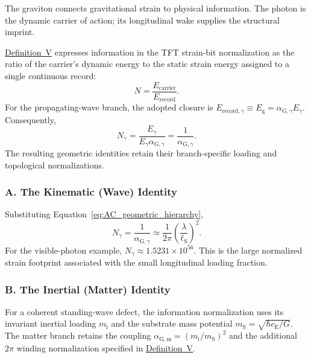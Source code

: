 The graviton connects gravitational strain to physical information. The photon is the dynamic carrier of action; its longitudinal wake supplies the structural imprint.

\hyperref[def:definition_five]{Definition~V} expresses information in the TFT strain-bit normalization as the ratio of the carrier's dynamic energy to the static strain energy assigned to a single continuous record:
\begin{equation}
    N=\frac{E_{\mathrm{carrier}}}{E_{\mathrm{record}}}.
    \label{eq:AC_information_ratio}
\end{equation}
For the propagating-wave branch, the adopted closure is $E_{\mathrm{record},\gamma}\equiv E_{\mathrm g}=\alpha_{\mathrm G,\gamma}E_\gamma$. Consequently,
\begin{equation}
    N_\gamma
    =\frac{E_\gamma}{E_\gamma\alpha_{\mathrm G,\gamma}}
    =\frac{1}{\alpha_{\mathrm G,\gamma}}.
    \label{eq:AC_photon_information_ratio}
\end{equation}
The resulting geometric identities retain their branch-specific loading and topological normalizations.

\subsubsection*{A. The Kinematic (Wave) Identity}

Substituting Equation~\eqref{eq:AC_geometric_hierarchy},
\begin{equation}
    N_\gamma
    =\frac{1}{\alpha_{\mathrm G,\gamma}}
    \simeq\frac{1}{2\pi}
    \left(\frac{\lambda}{\ell_{\mathrm S}}\right)^{2}.
    \label{eq:AC_wave_information_identity}
\end{equation}
For the visible-photon example, $N_\gamma\approx1.5231\times10^{56}$. This is the large normalized strain footprint associated with the small longitudinal loading fraction.

\subsubsection*{B. The Inertial (Matter) Identity}

For a coherent standing-wave defect, the information normalization uses its invariant inertial loading $m_{\mathrm i}$ and the substrate mass potential $m_{\mathrm S}=\sqrt{\hbar c_{\mathrm E}/G}$. The matter branch retains the coupling $\alpha_{\mathrm G,\mathrm m}=(m_{\mathrm i}/m_{\mathrm S})^{2}$ and the additional $2\pi$ winding normalization specified in \hyperref[def:definition_five]{Definition~V}.

